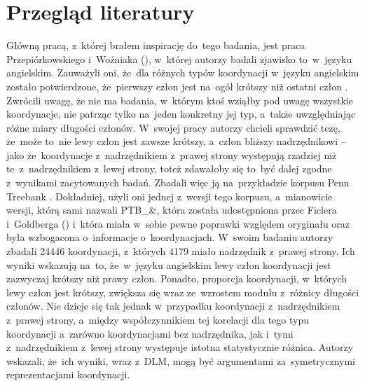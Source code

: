 \documentclass[licencjacka]{pracamgr_Kogni}
\begin{document}
    \section{Przegląd literatury}\label{sec:przeglad-literatury}
    Główną pracą, z~której brałem inspirację do~tego badania, jest praca Przepiórkowskiego i~Woźniaka (\citeyear{Przepiorkowski2023}), w~której autorzy badali zjawisko to~w~języku angielskim.
    Zauważyli oni, że~dla różnych typów koordynacji w~języku angielskim zostało potwierdzone, że~pierwszy człon jest na~ogół krótszy niż ostatni człon \citep{Gibson1996, Temperley2005, Lohmann2014}.
    Zwrócili uwagę, że nie ma badania, w~którym ktoś wziąłby pod uwagę wszystkie koordynacje, nie patrząc tylko na~jeden konkretny jej typ, a~także uwzględniając różne miary długości członów.
    W~swojej pracy autorzy chcieli sprawdzić tezę, że~może to~nie lewy człon jest zawsze krótszy, a~człon bliższy nadrzędnikowi -- jako że~koordynacje z~nadrzędnikiem z~prawej strony występują rzadziej niż te~z~nadrzędnikiem z~lewej strony, toteż zdawałoby się to~być dalej zgodne z~wynikami zacytowanych badań.
    Zbadali więc ją na~przykładzie korpusu Penn Treebank \citep{Marcus1993}. Dokładniej, użyli oni jednej z~wersji tego korpusu, a~mianowicie wersji, którą sami nazwali PTB_{\&}, która została udostępniona przec Ficlera i~Goldberga (\citeyear{Ficler2016}) i~która miała w~sobie pewne poprawki względem oryginału oraz była wzbogacona o~informacje o~koordynacjach.
    W~swoim badaniu autorzy zbadali 24446 koordynacji, z~których 4179 miało nadrzędnik z~prawej strony. Ich wyniki wskazują na~to, że~w~języku angielskim lewy człon koordynacji jest zazwyczaj krótszy niż prawy człon.
    Ponadto, proporcja koordynacji, w~których lewy człon jest krótszy, zwiększa się wraz ze~wzrostem modułu z~różnicy długości członów.
    Nie dzieje się tak jednak w~przypadku koordynacji z~nadrzędnikiem z~prawej strony, a~między współczynnikiem tej korelacji dla tego typu koordynacji a~zarówno koordynacjami bez nadrzędnika, jak i~tymi z~nadrzędnikiem z~lewej strony występuje istotna statystycznie różnica.
    Autorzy wskazali, że~ich wyniki, wraz z~DLM, mogą być argumentami za~symetrycznymi reprezentacjami koordynacji.
\end{document}
